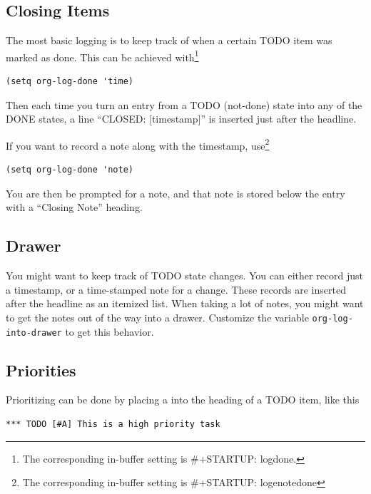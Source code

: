 \subsection{Closing Items}
The most basic logging is to keep track of when a certain TODO item was marked as done. This can be achieved with\footnote{The corresponding in-buffer setting is \#+STARTUP: logdone.}
\begin{tcolorbox}
\begin{verbatim}
(setq org-log-done 'time)
\end{verbatim}
\end{tcolorbox}


Then each time you turn an entry from a TODO (not-done) state into any of the DONE states, a line ``CLOSED: [timestamp]'' is inserted just after the headline.

If you want to record a note along with the timestamp, use\footnote{The corresponding in-buffer setting is \#+STARTUP: logenotedone}
\begin{tcolorbox}
\begin{verbatim}
(setq org-log-done 'note)
\end{verbatim}
\end{tcolorbox}

You are then be prompted for a note, and that note is stored below the entry with a ``Closing Note'' heading.

\subsection{Drawer}
You might want to keep track of TODO state changes. You can either record just a timestamp, or a time-stamped note for a change. These records are inserted after the headline as an itemized list. When taking a lot of notes, you might want to get the notes out of the way into a drawer. Customize the variable \verb|org-log-into-drawer| to get this behavior.


\subsection{Priorities}
Prioritizing can be done by placing a  into the heading of a TODO item, like this
\begin{tcolorbox}
\begin{verbatim}
*** TODO [#A] This is a high priority task
\end{verbatim}
\end{tcolorbox}


